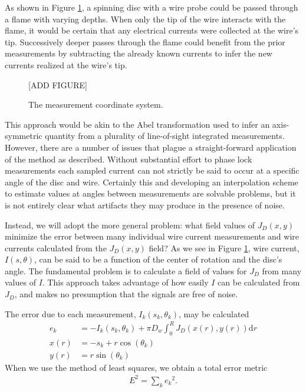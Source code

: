 As shown in Figure \ref{fig:coordinate}, a spinning disc with a wire probe could be passed through a flame with varying depths.  When only the tip of the wire interacts with the flame, it would be certain that any electrical currents were collected at the wire's tip.  Successively deeper passes through the flame could benefit from the prior measurements by subtracting the already known currents to infer the new currents realized at the wire's tip. 

\begin{figure}
\begin{center}
[ADD FIGURE]
\caption{The measurement coordinate system.}\label{fig:coordinate}
\end{center}
\end{figure}

This approach would be akin to the Abel transformation used to infer an axis-symmetric quantity from a plurality of line-of-sight integrated measurements.  However, there are a number of issues that plague a straight-forward application of the method as described.  Without substantial effort to phase lock measurements each sampled current can not strictly be said to occur at a specific angle of the disc and wire.  Certainly this and developing an interpolation scheme to estimate values at angles between measurements are solvable problems, but it is not entirely clear what artifacts they may produce in the presence of noise.

Instead, we will adopt the more general problem: what field values of $J_D(x,y)$ minimize the error between many individual wire current measurements and wire currents calculated from the $J_D(x,y)$ field?  As we see in Figure \ref{fig:coordinate}, wire current, $I(s,\theta)$, can be said to be a function of the center of rotation and the disc's angle.  The fundamental problem is to calculate a field of values for $J_D$ from many values of $I$.  This approach takes advantage of how easily $I$ can be calculated from $J_D$, and makes no presumption that the signals are free of noise.

The error due to each measurement, $I_k(s_k, \theta_k)$, may be calculated
\begin{subequations}\label{eqn:ek}
\begin{align}
e_k &= - I_k\left(s_k, \theta_k\right) + \pi D_w \int_0^R J_D\left(x(r), y(r)\right) \mathrm{d} r\\
x(r) &= -s_k + r\cos(\theta_k)\\
y(r) &= r\sin(\theta_k)
\end{align}
\end{subequations}
When we use the method of least squares, we obtain a total error metric
\begin{align}
E^2 = \sum_k e_k{^2}.
\end{align}

